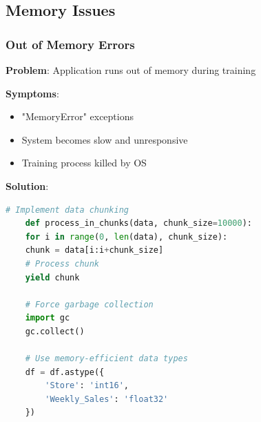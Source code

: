 \subsection{Memory Issues}

\subsubsection{Out of Memory Errors}

\textbf{Problem}: Application runs out of memory during training

\textbf{Symptoms}:
\begin{itemize}
	\item "MemoryError" exceptions
	\item System becomes slow and unresponsive
	\item Training process killed by OS
\end{itemize}

\textbf{Solution}:
\begin{lstlisting}[language=python,basicstyle=\color{blue}]
	# Implement data chunking
	def process_in_chunks(data, chunk_size=10000):
	for i in range(0, len(data), chunk_size):
	chunk = data[i:i+chunk_size]
	# Process chunk
	yield chunk
	
	# Force garbage collection
	import gc
	gc.collect()
	
	# Use memory-efficient data types
	df = df.astype({
		'Store': 'int16',
		'Weekly_Sales': 'float32'
	})
\end{lstlisting}

